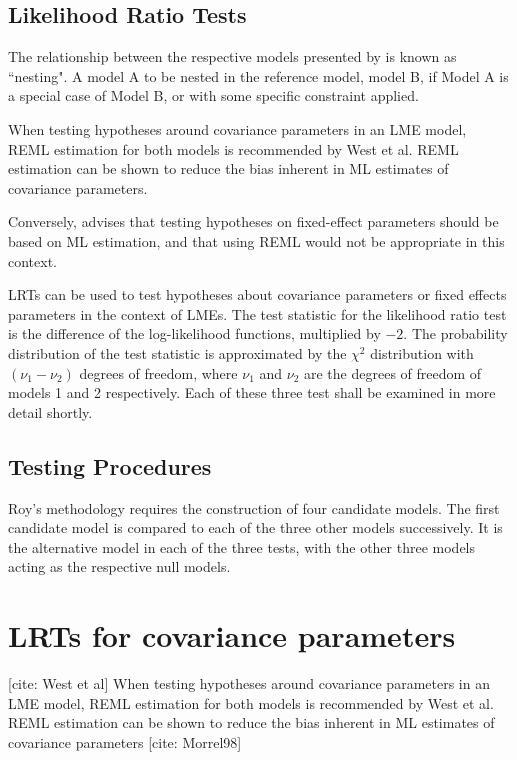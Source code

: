 \documentclass[12pt, a4paper]{report}
\theoremstyle{plain}
\theoremstyle{definition}
\theoremstyle{remark}
\begin{document}

\subsection{Likelihood Ratio Tests}
The relationship between the respective models presented by \citet{ARoy2009} is known as ``nesting".
A model A to be nested in the reference model, model B, if Model A is a special case
of Model B, or with some specific constraint applied.


When testing hypotheses around covariance parameters in an LME model, REML estimation for both models is recommended by West et al. REML estimation can be shown to reduce the bias inherent in ML estimates of covariance parameters.

Conversely, \citet{ARoy2009} advises that testing hypotheses on fixed-effect parameters should be based on ML estimation, and that using REML would not be appropriate in this
context.

LRTs can be used to test hypotheses about covariance parameters or fixed effects
parameters in the context of LMEs. The test statistic for the likelihood ratio test
is the difference of the log-likelihood functions, multiplied by $-2$. The probability
distribution of the test statistic is approximated by the $\chi^2$ distribution with $(\nu_1 - \nu_2)$
degrees of freedom, where $\nu_1$ and $\nu_2$ are the degrees of freedom of models 1 and 2
respectively. Each of these three test shall be examined in more detail shortly.

\subsection{Testing Procedures}
Roy's methodology requires the construction of four candidate models. The first candidate model is compared to each of the three other models successively. It is the
alternative model in each of the three tests, with the other three models acting as the
respective null models.



\section{LRTs for covariance parameters}
[cite: West et al] When testing hypotheses around covariance parameters in an LME model, REML estimation for both models is recommended by West et al. REML estimation can be shown to reduce the bias inherent in ML estimates of covariance parameters [cite: Morrel98]
\end{document}
